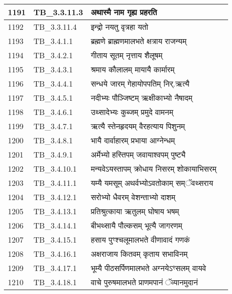 \documentclass[17pt]{extarticle}
\begin{document}
\begin{longtable}{||p{0.4in}||p{0.9in}||p{4.0in}||p{0.9in}||}
        \hline
            1191 & TB\_3.3.11.3 & अथास्मै नाम गृह्य प्रहरति &      \\
        \hline
            1192 & TB\_3.3.11.4 & इन्द्रो नयतु वृत्रहा यतो &      \\
        \hline
            1193 & TB\_3.4.1.1 & ब्रह्मणे ब्राह्मणमालभते क्षत्राय राजन्यम् &      \\
        \hline
            1194 & TB\_3.4.2.1 & गीताय सूतम् नृत्ताय शैलूषम् &      \\
        \hline
            1195 & TB\_3.4.3.1 & श्रमाय कौलालम् मायायै कार्मारम् &      \\
        \hline
            1196 & TB\_3.4.4.1 & सन्धये जारम् गेहायोपपतिम् निर्.ऋत्यै &      \\
        \hline
            1197 & TB\_3.4.5.1 & नदीभ्यः पौञ्जिष्टम् ऋक्षीकाभ्यो नैषादम् &      \\
        \hline
            1198 & TB\_3.4.6.1 & उथ्सादेभ्यः कुब्जम् प्रमुदे वामनम् &      \\
        \hline
            1199 & TB\_3.4.7.1 & ऋत्यै स्तेनहृदयम् वैरहत्याय पिशुनम् &      \\
        \hline
            1200 & TB\_3.4.8.1 & भायै दार्वाहारम् प्रभाया आग्नेन्धम् &      \\
        \hline
            1201 & TB\_3.4.9.1 & अर्मेभ्यो हस्तिपम् जवायाश्वपम् पुष्ट्यै &      \\
        \hline
            1202 & TB\_3.4.10.1 & मन्यवेऽयस्तापम् क्रोधाय निसरम् शोकायाभिसरम् &      \\
        \hline
            1203 & TB\_3.4.11.1 & यम्यै यमसूम् अथर्वभ्योऽवतोकाम् सम्ॅवथ्सराय &      \\
        \hline
            1204 & TB\_3.4.12.1 & सरोभ्यो धैवरम् वेशन्ताभ्यो दाशम् &      \\
        \hline
            1205 & TB\_3.4.13.1 & प्रतिश्रुत्काया ऋतुलम् घोषाय भषम् &      \\
        \hline
            1206 & TB\_3.4.14.1 & बीभथ्सायै पौल्कसम् भूत्यै जागरणम् &      \\
        \hline
            1207 & TB\_3.4.15.1 & हसाय पुꣳश्चलूमालभते वीणावादं गणकं &      \\
        \hline
            1208 & TB\_3.4.16.1 & अक्षराजाय कितवम् कृताय सभाविनम् &      \\
        \hline
            1209 & TB\_3.4.17.1 & भूम्यै पीठसर्पिणमालभते अग्नयेऽꣳसलम् वायवे &      \\
        \hline
            1210 & TB\_3.4.18.1 & वाचे पुरुषमालभते प्राणमपानं ॅव्यानमुदानं &      \\

\end{longtable}
\end{document}
